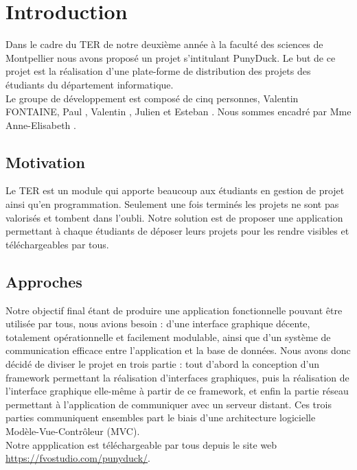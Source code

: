 \documentclass[twoside]{report}
\begin{document}
\chapter*{Introduction} %
Dans le cadre du TER de notre deuxième année à la faculté des sciences de Montpellier nous avons proposé un projet s'intitulant PunyDuck. Le but de ce projet est la réalisation d'une plate-forme de distribution des projets des étudiants du département informatique.\\

Le groupe de développement est composé de cinq personnes, Valentin \textsc{FONTAINE}, Paul , Valentin , Julien  et Esteban . Nous sommes encadré par Mme Anne-Elisabeth .

\section*{Motivation}

Le TER est un module qui apporte beaucoup aux étudiants en gestion de projet ainsi qu'en programmation. Seulement une fois terminés les projets ne sont pas valorisés et tombent dans l'oubli. Notre solution est de proposer une application permettant à chaque étudiants de déposer leurs projets pour les rendre visibles et téléchargeables par tous.

\section*{Approches}
Notre objectif final étant de produire une application fonctionnelle pouvant être utilisée par tous, nous avions besoin : d'une interface graphique décente, totalement opérationnelle et facilement modulable, ainsi que d'un système de communication efficace entre l'application et la base de données. Nous avons donc décidé de diviser le projet en trois partie : tout d'abord la conception d'un framework permettant la réalisation d'interfaces graphiques, puis la réalisation de l'interface graphique elle-même à partir de ce framework, et enfin la partie réseau permettant à l'application de communiquer avec un serveur distant. Ces trois parties communiquent ensembles part le biais d'une architecture logicielle Modèle-Vue-Contrôleur (MVC).\\
Notre appplication est téléchargeable par tous depuis le site web \url{ https://fvostudio.com/punyduck/}.
\end{document}

